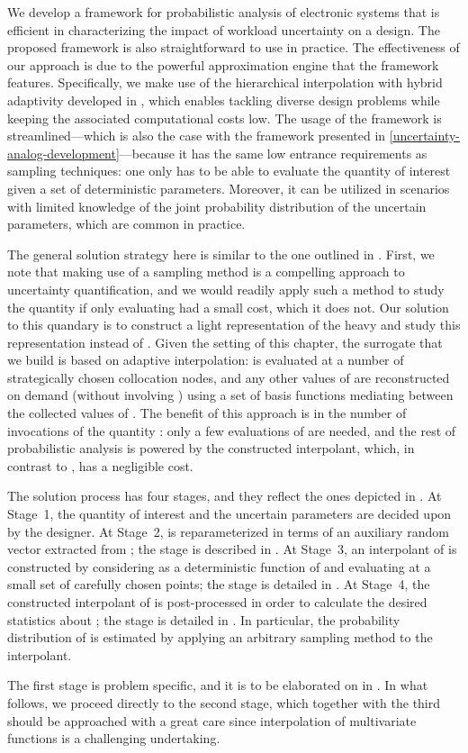 We develop a framework for probabilistic analysis of electronic systems that is
efficient in characterizing the impact of workload uncertainty on a design. The
proposed framework is also straightforward to use in practice. The effectiveness
of our approach is due to the powerful approximation engine that the framework
features. Specifically, we make use of the hierarchical interpolation with
hybrid adaptivity developed in \cite{klimke2006, ma2009, jakeman2012}, which
enables tackling diverse design problems while keeping the associated
computational costs low. The usage of the framework is streamlined---which is
also the case with the framework presented in
\cref{uncertainty-analog-development}---because it has the same low entrance
requirements as sampling techniques: one only has to be able to evaluate the
quantity of interest given a set of deterministic parameters. Moreover, it can
be utilized in scenarios with limited knowledge of the joint probability
distribution of the uncertain parameters, which are common in practice.

The general solution strategy here is similar to the one outlined in
. First, we note that making use of a sampling method is a
compelling approach to uncertainty quantification, and we would readily apply
such a method to study the quantity \g if only evaluating \g had a small cost,
which it does not. Our solution to this quandary is to construct a light
representation of the heavy \g and study this representation instead of \g.
Given the setting of this chapter, the surrogate that we build is based on
adaptive interpolation: \g is evaluated at a number of strategically chosen
collocation nodes, and any other values of \g are reconstructed on demand
(without involving \g) using a set of basis functions mediating between the
collected values of \g. The benefit of this approach is in the number of
invocations of the quantity \g: only a few evaluations of \g are needed, and the
rest of probabilistic analysis is powered by the constructed interpolant, which,
in contrast to \g, has a negligible cost.

The solution process has four stages, and they reflect the ones depicted in
. At Stage~1, the quantity of interest \g and the uncertain
parameters \vu are decided upon by the designer. At Stage~2, \g is
reparameterized in terms of an auxiliary random vector \vz extracted from \vu;
the stage is described in . At Stage~3, an
interpolant of \g is constructed by considering \g as a deterministic function
of \vz and evaluating \g at a small set of carefully chosen points; the stage is
detailed in . At Stage~4, the constructed interpolant
of \g is post-processed in order to calculate the desired statistics about \g;
the stage is detailed in . In particular, the probability
distribution of \g is estimated by applying an arbitrary sampling method to the
interpolant.

The first stage is problem specific, and it is to be elaborated on in
. In what follows, we proceed directly to the second
stage, which together with the third should be approached with a great care
since interpolation of multivariate functions is a challenging undertaking.
